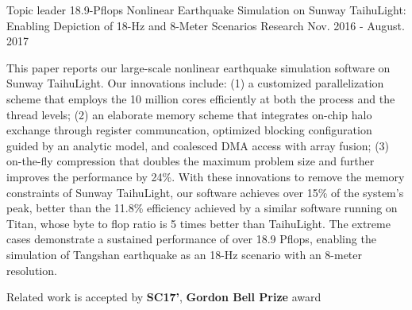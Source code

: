 \documentclass[11pt, a4paper]{awesome-cv}
\begin{document}
\begin{cventries}

  \cventry
    {Topic leader} %
    {18.9-Pflops Nonlinear Earthquake Simulation on Sunway TaihuLight: Enabling Depiction of 18-Hz and 8-Meter Scenarios} %
    {Research} %
    {Nov. 2016 - August. 2017} %
    {
      \begin{cvitems} %
        \item {This paper reports our large-scale nonlinear earthquake simulation software on Sunway TaihuLight. Our innovations include: (1) a customized parallelization scheme that employs the 10 million cores efficiently at both the process and the thread levels; (2) an elaborate memory scheme that integrates on-chip halo exchange through register communcation, optimized blocking configuration guided by an analytic model, and coalesced DMA access with array fusion; (3) on-the-fly compression that doubles the maximum problem size and further improves the performance by 24\%. With these innovations to remove the memory constraints of Sunway TaihuLight, our software achieves over 15\% of the system's peak, better than the 11.8\% efficiency achieved by a similar software running on Titan, whose byte to flop ratio is 5 times better than TaihuLight. The extreme cases demonstrate a sustained performance of over 18.9 Pflops, enabling the simulation of Tangshan earthquake as an 18-Hz scenario with an 8-meter resolution.}
       \item {Related work is accepted by \textbf{SC17'}, \textbf{Gordon Bell Prize}  award}
      \end{cvitems}
    }
      

\end{cventries}
\end{document}
